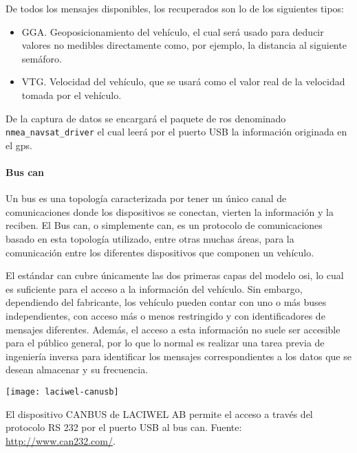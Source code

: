 De todos los mensajes disponibles, los recuperados son lo de los siguientes tipos:

\begin{itemize}
	\item GGA. Geoposicionamiento del vehículo, el cual será usado para deducir valores no medibles directamente como, por ejemplo, la distancia al siguiente semáforo.
	\item VTG. Velocidad del vehículo, que se usará como el valor real de la velocidad tomada por el vehículo.
\end{itemize}

De la captura de datos se encargará el paquete de \ac{ros} denominado \texttt{nmea\_navsat\_driver}  el cual leerá por el puerto USB la información originada en el \ac{gps}.

\paragraph{Bus \Acrfull{can}}

Un bus es una topología caracterizada por tener un único canal de comunicaciones donde los dispositivos se conectan, vierten la información y la reciben. El Bus \ac{can}, o simplemente \ac{can}, es un protocolo de comunicaciones basado en esta topología utilizado, entre otras muchas áreas, para la comunicación entre los diferentes dispositivos que componen un vehículo.

El estándar \ac{can} cubre únicamente las dos primeras capas del modelo \ac{osi}, lo cual es suficiente para el acceso a la información del vehículo. Sin embargo, dependiendo del fabricante, los vehículo pueden contar con uno o más buses independientes, con acceso más o menos restringido y con identificadores de mensajes diferentes. Además, el acceso a esta información no suele ser accesible para el público general, por lo que lo normal es realizar una tarea previa de ingeniería inversa para identificar los mensajes correspondientes a los datos que se desean almacenar y su frecuencia.

\begin{marginfigure}
	\centering
	\texttt{[image: laciwel-canusb]}
	\caption[Dispositivo \acrshort{can} BUS de LACIWEL AB]{El dispositivo CANBUS de LACIWEL AB permite el acceso a través del protocolo RS 232 por el puerto USB al bus \ac{can}. Fuente: \url{http://www.can232.com/}.}
	\label{fig:laciwel-canusb}
\end{marginfigure}

